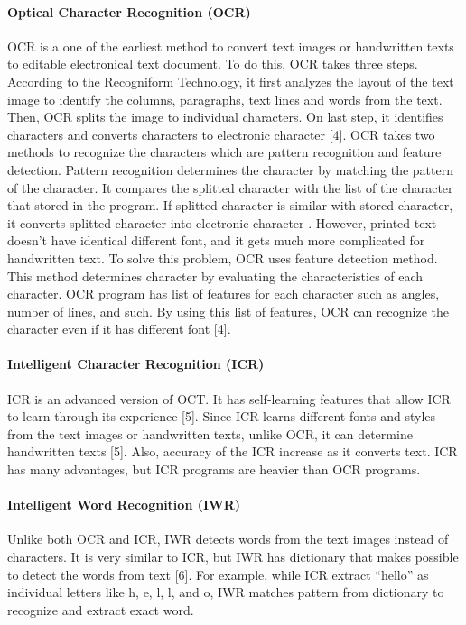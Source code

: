 \documentclass[article, onecolumn, draftclsnofoot,10pt, compsoc]{IEEEtran}
\begin{document}
\paragraph{Optical Character Recognition (OCR)}
OCR is a one of the earliest method to convert text images or handwritten texts to editable electronical text document. To do this, OCR takes three steps. According to the Recogniform Technology, it first analyzes the layout of the text image to identify the columns, paragraphs, text lines and words from the text. Then, OCR splits the image to individual characters. On last step, it identifies characters and converts characters to electronic character [4]. OCR takes two methods to recognize the characters which are pattern recognition and feature detection. Pattern recognition determines the character by matching the pattern of the character. It compares the splitted character with the list of the character that stored in the program. If splitted character is similar with stored character, it converts splitted character into electronic character . However, printed text doesn\rq t have identical different font, and it gets much more complicated for handwritten text. To solve this problem, OCR uses feature detection method. This method determines character by evaluating the characteristics of each character. OCR program has list of features for each character such as angles, number of lines, and such. By using this list of features, OCR can recognize the character even if it has different font [4].

\paragraph{Intelligent Character Recognition (ICR)}
ICR is an advanced version of OCT. It has self-learning features that allow ICR to learn through its experience [5]. Since ICR learns different fonts and styles from the text images or handwritten texts, unlike OCR, it can determine handwritten texts [5].  Also, accuracy of the ICR increase as it converts text. ICR has many advantages, but ICR programs are heavier than OCR programs.

\paragraph{Intelligent Word Recognition (IWR)}
Unlike both OCR and ICR, IWR detects words from the text images instead of characters. It is very similar to ICR, but IWR has dictionary that makes possible to detect the words from text [6]. For example, while ICR extract \enquote{hello} as individual letters like h, e, l, l, and o, IWR matches pattern from dictionary to recognize and extract exact word. 
\end{document}
